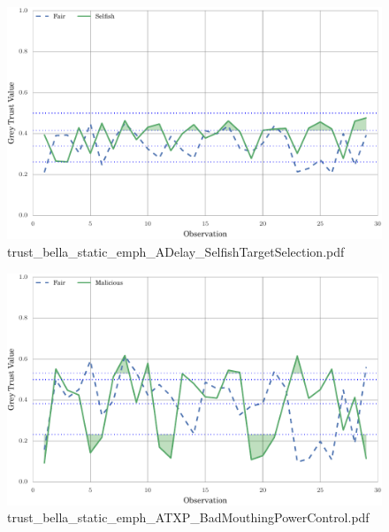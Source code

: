 \documentclass{article}
\begin{document}
\begin{figure}[h!]
\centering
\includegraphics[width=\linewidth]{trust_bella_static_emph_ADelay_SelfishTargetSelection.pdf}
\caption{trust\_bella\_static\_emph\_ADelay\_SelfishTargetSelection.pdf}
\end{figure}




\begin{figure}[h!]
\centering
\includegraphics[width=\linewidth]{trust_bella_static_emph_ATXP_BadMouthingPowerControl.pdf}
\caption{trust\_bella\_static\_emph\_ATXP\_BadMouthingPowerControl.pdf}
\end{figure}
\end{document}
